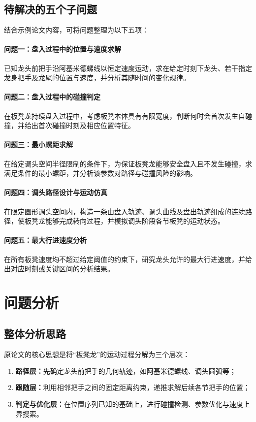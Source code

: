 \documentclass[12pt,a4paper]{ctexart}
\begin{document}
\subsection{待解决的五个子问题}
结合示例论文内容，可将问题整理为以下五项：

\paragraph{问题一：盘入过程中的位置与速度求解}
已知龙头前把手沿阿基米德螺线以恒定速度运动，求在给定时刻下龙头、若干指定龙身把手及龙尾的位置与速度，并分析其随时间的变化规律。

\paragraph{问题二：盘入过程中的碰撞判定}
在板凳龙持续盘入过程中，考虑板凳本体具有有限宽度，判断何时会首次发生自碰撞，并给出首次碰撞时刻及相应位置特征。

\paragraph{问题三：最小螺距求解}
在给定调头空间半径限制的条件下，为保证板凳龙能够安全盘入且不发生碰撞，求满足条件的最小螺距，并分析该参数对路径与碰撞风险的影响。

\paragraph{问题四：调头路径设计与运动仿真}
在限定圆形调头空间内，构造一条由盘入轨迹、调头曲线及盘出轨迹组成的连续路径，使板凳龙能够完成转向过程，并模拟调头阶段各节板凳的运动状态。

\paragraph{问题五：最大行进速度分析}
在所有板凳速度均不超过给定阈值的约束下，研究龙头允许的最大行进速度，并给出对应时刻或关键区间的分析结果。

\section{问题分析}

\subsection{整体分析思路}
原论文的核心思想是将“板凳龙”的运动过程分解为三个层次：
\begin{enumerate}[leftmargin=2em]
    \item \textbf{路径层：}先确定龙头前把手的几何轨迹，如阿基米德螺线、调头圆弧等；
    \item \textbf{跟随层：}利用相邻把手之间的固定距离约束，递推求解后续各节把手的位置；
    \item \textbf{判定与优化层：}在位置序列已知的基础上，进行碰撞检测、参数优化与速度上界搜索。
\end{enumerate}
\end{document}
